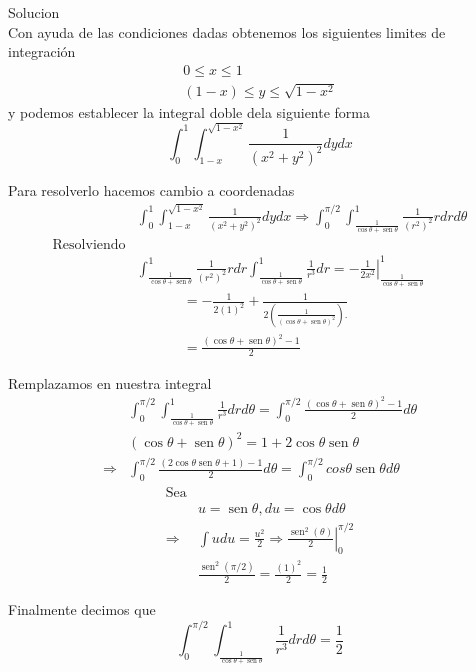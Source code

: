 Solucion\\
Con ayuda de las condiciones dadas obtenemos los siguientes limites de integración
$$
\begin{gathered}
0 \leq x \leq 1 \\
(1-x) \leq y \leq \sqrt{1-x^2}
\end{gathered}
$$
y podemos establecer la integral doble dela siguiente forma
$$
\int_0^1 \int_{1-x}^{\sqrt{1-x^2}} \frac{1}{\left(x^2+y^2\right)^2} d y d x
$$

Para resolverlo hacemos cambio a coordenadas
$$
\begin{aligned}
& \int_0^1 \int_{1-x}^{\sqrt{1-x^2}} \frac{1}{\left(x^2+y^2\right)^2} d y d x\Rightarrow \int_0^{\pi / 2} \int_{\frac{1}{\cos \theta+\operatorname{sen} \theta}}^1{\frac{1}{\left(r^2\right)^2} r d r d \theta} \\
\text{Resolviendo}\\
& \int_{\frac{1}{\cos \theta+\operatorname{sen} \theta}}^1{\frac{1}
{\left(r^2\right)^2} r d r} \int_{\frac{1}{\cos \theta+\operatorname{sen} \theta}}^1 \frac{1}{r^3} d r=-\left.\frac{1}{2 x^2}\right|_{\frac{1}{\cos \theta+\operatorname{sen} \theta}}^1
\end{aligned}
$$
$$
\begin{aligned}
& =-\frac{1}{2(1)^2}+\frac{1}{2\left(\frac{1}{(\cos \theta+\operatorname{sen} \theta)^2}\right).} \\
& =\frac{(\cos \theta+\operatorname{sen} \theta)^2-1}{2}
\end{aligned}
$$

Remplazamos en nuestra integral
$$
\begin{aligned}
& \int_0^{\pi / 2} \int_{\frac{1}{\cos \theta+\operatorname{sen} \theta}}^1 \frac{1}{r^3} d r d \theta=\int_0^{\pi / 2} \frac{(\cos\theta+\operatorname{sen} \theta)^2-1}{2} d \theta \\
& (\cos \theta+\operatorname{sen} \theta)^2=1+2 \cos \theta \operatorname{sen} \theta \\
\Rightarrow & \int_0^{\pi / 2} \frac{(2\operatorname{cos}\theta \operatorname{sen} \theta+1)-1}{2} d \theta=\int_0^{\pi / 2} cos \theta \operatorname{sen} \theta d \theta
\end{aligned}
$$
$$
\begin{aligned}
\text{Sea}\\
&u=\operatorname{sen} \theta, d u=\cos \theta d \theta \\
\Rightarrow & \int u d u=\left.\frac{u^2}{2} \Rightarrow \frac{\operatorname{sen}^2(\theta)}{2}\right|_0 ^{\pi / 2} \\
& \frac{\operatorname{sen}^2(\pi / 2)}{2}=\frac{(1)^2}{2}=\frac{1}{2}
\end{aligned}
$$

Finalmente decimos que
$$
\int_0^{\pi / 2} \int_{\frac{1}{\cos \theta+\operatorname{sen} \theta}}^1 \frac{1}{r^3} d r d \theta=\frac{1}{2}
$$
